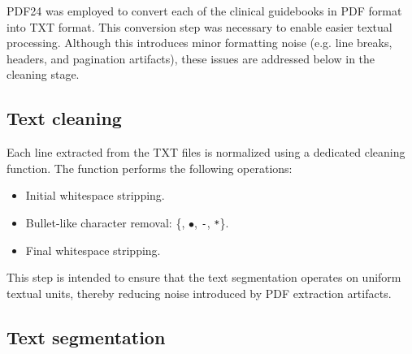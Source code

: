 \documentclass[11pt,a4paper]{article}
\begin{document}
PDF24 \citep{pdf24} was employed to convert each of the clinical guidebooks in PDF format into TXT format. This conversion step was necessary to enable easier textual processing. Although this introduces minor formatting noise (e.g. line breaks, headers, and pagination artifacts), these issues are addressed below in the cleaning stage.

\subsection{Text cleaning}

Each line extracted from the TXT files is normalized using a dedicated cleaning function. The function performs the following operations:

\vspace{-0.1cm}

\begin{itemize}
    \item Initial whitespace stripping.
    \vspace{-0.2cm}
    \item Bullet-like character removal: \{\textbullet{}, $\bullet$, \texttt{-}, \texttt{*}\}.
    \vspace{-0.2cm}
    \item Final whitespace stripping.
\end{itemize}

\vspace{-0.1cm}

This step is intended to ensure that the text segmentation operates on uniform textual units, thereby reducing noise introduced by PDF extraction artifacts.

\subsection{Text segmentation}



\end{document}
